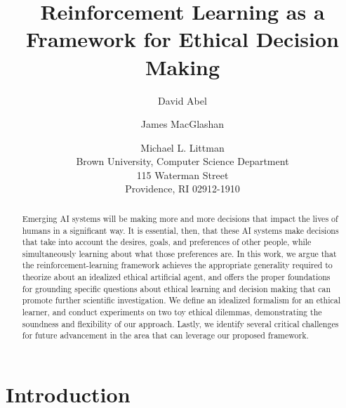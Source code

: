 \documentclass[11pt]{article}
\title{Reinforcement Learning as a Framework for Ethical Decision Making}
\author{David Abel \and James MacGlashan \and Michael L. Littman \\ Brown University, Computer Science Department \\ 115 Waterman Street \\ Providence, RI 02912-1910}
\date{}                                           %
\begin{document}
\maketitle


\begin{abstract}
Emerging AI systems will be making more and more decisions that impact the lives of humans in a significant way. It is essential, then, that these AI systems make decisions that take into account the desires, goals, and preferences of other people, while simultaneously learning about what those preferences are.
In this work, we argue that the reinforcement-learning framework achieves the appropriate generality required to theorize about an idealized ethical artificial agent, and offers the proper foundations for grounding specific questions about ethical learning and decision making that can promote further scientific investigation. We define an idealized formalism for an ethical learner, and conduct experiments on two toy ethical dilemmas, demonstrating the soundness and flexibility of our approach.
Lastly, we identify several critical challenges for future advancement in the area that can leverage our proposed framework.

\end{abstract}

\section{Introduction}
\end{document}
